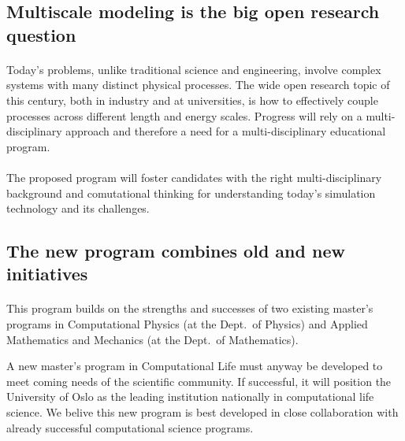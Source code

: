 \documentclass[%
twoside,                 %
final,                   %
10pt]{article}
\begin{document}
\subsection*{Multiscale modeling is the big open research question}


\paragraph{}
Today's problems, unlike traditional
science and engineering, involve complex systems with many distinct
physical processes. The wide open research topic of this century, both
in industry and at universities, is how to effectively couple
processes across different length and energy scales. Progress will
rely on a multi-disciplinary approach and therefore a need for
a multi-disciplinary educational program.




\paragraph{}
The proposed program will foster candidates with the right
multi-disciplinary background and comutational thinking for
understanding today's simulation technology and its challenges.




\subsection*{The new program combines old and new initiatives}

\paragraph{}

This program builds on the strengths and successes of two existing master's
programs in Computational Physics (at the Dept.~of Physics) and
Applied Mathematics and Mechanics (at the Dept.~of Mathematics).

A new master's program in Computational Life must anyway be developed to
meet coming needs of the scientific community. If successful, it will
position the University of Oslo as the leading institution
nationally in computational life science. We belive this new program is
best developed in close collaboration with already successful
computational science programs.
\end{document}
